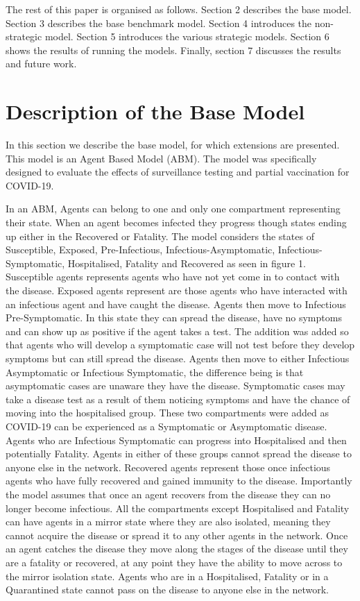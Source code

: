 \documentclass{article}
\begin{document}
The rest of this paper is organised as follows. Section 2 describes the base model. Section 3 describes the base benchmark model. Section 4 introduces the non-strategic model. Section 5 introduces the various strategic models. Section 6 shows the results of running the models. Finally, section 7 discusses the results and future work.



\newpage
\section{Description of the Base Model \label{description}}

In this section we describe the base model, for which extensions are presented. 
This model is an Agent Based Model (ABM). 
The model was specifically designed to evaluate the effects of surveillance testing and partial vaccination for COVID-19.\newline

In an ABM, Agents can belong to one and only one compartment representing their state. 
When an agent becomes infected they progress though states ending up either in the Recovered or Fatality. 
The model considers the states of Susceptible, Exposed, Pre-Infectious, Infectious-Asymptomatic, Infectious-Symptomatic, Hospitalised, Fatality and Recovered as seen in figure 1.
Susceptible agents represents agents who have not yet come in to contact with the disease. 
Exposed agents represent are those agents who have interacted with an infectious agent and have caught the disease.
Agents then move to Infectious Pre-Symptomatic. In this state they can spread the disease, have no symptoms and can show up as positive if the agent takes a test. The addition was added so that agents who will develop a symptomatic case will not test before they develop symptoms but can still spread the disease.
Agents then move to either Infectious Asymptomatic or Infectious Symptomatic, the difference being is that asymptomatic cases are unaware they have the disease. Symptomatic cases may take a disease test as a result of them noticing symptoms and have the chance of moving into the hospitalised group. These two compartments were added as COVID-19 can be experienced as a Symptomatic or Asymptomatic disease. Agents who are Infectious Symptomatic can progress into Hospitalised and then potentially Fatality. Agents in either of these groups cannot spread the disease to anyone else in the network.
Recovered agents represent those once infectious agents who have fully recovered and gained immunity to the disease. 
Importantly the model assumes that once an agent recovers from the disease they can no longer become infectious. \newline 
All the compartments except Hospitalised and Fatality can have agents in a mirror state where they are also isolated, meaning they cannot acquire the disease or spread it to any other agents in the network. Once an agent catches the disease they move along the stages of the disease until they are a fatality or recovered, at any point they have the ability to move across to the mirror isolation state. Agents who are in a Hospitalised, Fatality or in a Quarantined state cannot pass on the disease to anyone else in the network.
\end{document}
